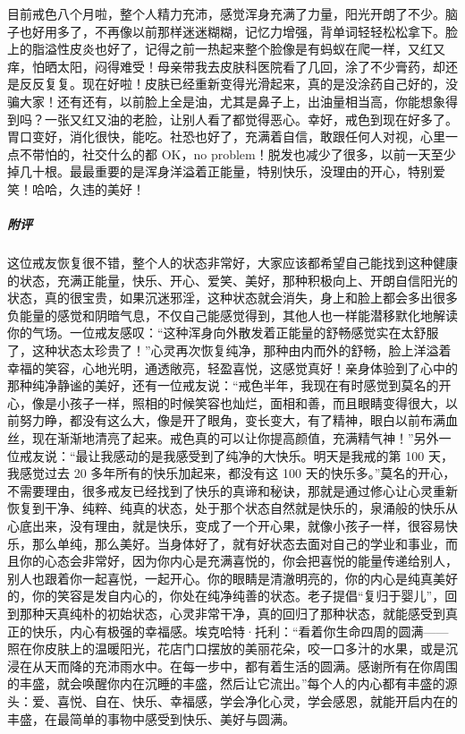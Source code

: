 \begin{case}
    目前戒色八个月啦，整个人精力充沛，感觉浑身充满了力量，阳光开朗了不少。脑子也好用多了，不再像以前那样迷迷糊糊，记忆力增强，背单词轻轻松松拿下。脸上的脂溢性皮炎也好了，记得之前一热起来整个脸像是有蚂蚁在爬一样，又红又痒，怕晒太阳，闷得难受！母亲带我去皮肤科医院看了几回，涂了不少膏药，却还是反反复复。现在好啦！皮肤已经重新变得光滑起来，真的是没涂药自己好的，没骗大家！还有还有，以前脸上全是油，尤其是鼻子上，出油量相当高，你能想象得到吗？一张又红又油的老脸，让别人看了都觉得恶心。幸好，戒色到现在好多了。胃口变好，消化很快，能吃。社恐也好了，充满着自信，敢跟任何人对视，心里一点不带怕的，社交什么的都 OK，no problem！脱发也减少了很多，以前一天至少掉几十根。最最重要的是浑身洋溢着正能量，特别快乐，没理由的开心，特别爱笑！哈哈，久违的美好！
    \subparagraph{附评} 这位戒友恢复很不错，整个人的状态非常好，大家应该都希望自己能找到这种健康的状态，充满正能量，快乐、开心、爱笑、美好，那种积极向上、开朗自信阳光的状态，真的很宝贵，如果沉迷邪淫，这种状态就会消失，身上和脸上都会多出很多负能量的感觉和阴暗气息，不仅自己能感觉得到，其他人也一样能潜移默化地解读你的气场。一位戒友感叹：“这种浑身向外散发着正能量的舒畅感觉实在太舒服了，这种状态太珍贵了！”心灵再次恢复纯净，那种由内而外的舒畅，脸上洋溢着幸福的笑容，心地光明，通透敞亮，轻盈喜悦，这感觉真好！亲身体验到了心中的那种纯净静谧的美好，还有一位戒友说：“戒色半年，我现在有时感觉到莫名的开心，像是小孩子一样，照相的时候笑容也灿烂，面相和善，而且眼睛变得很大，以前努力睁，都没有这么大，像是开了眼角，变长变大，有了精神，眼白以前布满血丝，现在渐渐地清亮了起来。戒色真的可以让你提高颜值，充满精气神！”另外一位戒友说：“最让我感动的是我感受到了纯净的大快乐。明天是我戒的第 100 天，我感觉过去 20 多年所有的快乐加起来，都没有这 100 天的快乐多。”莫名的开心，不需要理由，很多戒友已经找到了快乐的真谛和秘诀，那就是通过修心让心灵重新恢复到干净、纯粹、纯真的状态，处于那个状态自然就是快乐的，泉涌般的快乐从心底出来，没有理由，就是快乐，变成了一个开心果，就像小孩子一样，很容易快乐，那么单纯，那么美好。当身体好了，就有好状态去面对自己的学业和事业，而且你的心态会非常好，因为你内心是充满喜悦的，你会把喜悦的能量传递给别人，别人也跟着你一起喜悦，一起开心。你的眼睛是清澈明亮的，你的内心是纯真美好的，你的笑容是发自内心的，你处在纯净纯善的状态。老子提倡“复归于婴儿”，回到那种天真纯朴的初始状态，心灵非常干净，真的回归了那种状态，就能感受到真正的快乐，内心有极强的幸福感。埃克哈特·托利：“看着你生命四周的圆满——照在你皮肤上的温暖阳光，花店门口摆放的美丽花朵，咬一口多汁的水果，或是沉浸在从天而降的充沛雨水中。在每一步中，都有着生活的圆满。感谢所有在你周围的丰盛，就会唤醒你内在沉睡的丰盛，然后让它流出。”每个人的内心都有丰盛的源头：爱、喜悦、自在、快乐、幸福感，学会净化心灵，学会感恩，就能开启内在的丰盛，在最简单的事物中感受到快乐、美好与圆满。
\end{case}

